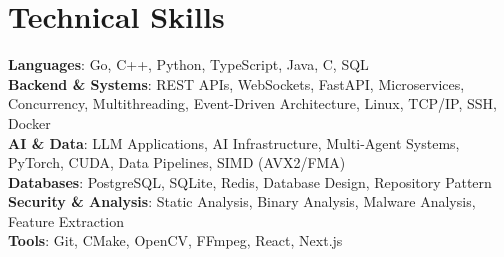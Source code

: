 \documentclass[letterpaper,11pt]{article}
\begin{document}
\section{Technical Skills}
 \begin{itemize}[leftmargin=0.15in, label={}]
    \small{\item{
     \textbf{Languages}{: Go, C++, Python, TypeScript, Java, C, SQL} \\
     \textbf{Backend \& Systems}{: REST APIs, WebSockets, FastAPI, Microservices, Concurrency, Multithreading, Event-Driven Architecture, Linux, TCP/IP, SSH, Docker} \\
     \textbf{AI \& Data}{: LLM Applications, AI Infrastructure, Multi-Agent Systems, PyTorch, CUDA, Data Pipelines, SIMD (AVX2/FMA)} \\
     \textbf{Databases}{: PostgreSQL, SQLite, Redis, Database Design, Repository Pattern} \\
     \textbf{Security \& Analysis}{: Static Analysis, Binary Analysis, Malware Analysis, Feature Extraction} \\
     \textbf{Tools}{: Git, CMake, OpenCV, FFmpeg, React, Next.js}
    }}
 \end{itemize}
 \vspace{-16pt}

\end{document}
